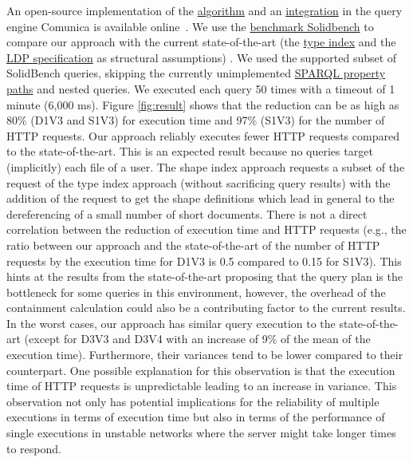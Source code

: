 An open-source implementation of the \href{https://github.com/constraintAutomaton/query-shape-detection}{algorithm} and an 
\href{https://github.com/constraintAutomaton/comunica-feature-link-traversal/tree/feature/shapeIndex}{integration} in the query engine 
Comunica \cite{taelman_iswc_resources_comunica_2018} is available online~.
We use the \href{https://github.com/SolidBench/SolidBench.js}{benchmark Solidbench} \cite{Taelman2023} to compare our approach with the current state-of-the-art (the \href{https://solid.github.io/type-indexes/}{type index} and the \href{https://www.w3.org/TR/ldp/}{LDP specification} as structural assumptions) \cite{Taelman2023}.
We used the supported subset of SolidBench queries, skipping the currently unimplemented \href{https://www.w3.org/TR/sparql11-query/#propertypaths}{SPARQL property paths} and nested queries.
We executed each query 50 times with a timeout of 1 minute (6,000 ms).
Figure \ref{fig:result} shows that the reduction can be as high as 80\% (D1V3 and S1V3) for execution time 
and 97\% (S1V3) for the number of HTTP requests.
Our approach reliably executes fewer HTTP requests compared to the state-of-the-art.
This is an expected result because no queries target (implicitly) each file of a user.
The shape index approach requests a subset of the request of the type index approach (without sacrificing query results) with the addition of the request to get the shape definitions which lead in general to the dereferencing of a small number of short documents.
There is not a direct correlation between the reduction of execution time and HTTP requests (e.g., the ratio 
between our approach and the state-of-the-art of the number of HTTP requests by the execution time for D1V3 is 0.5 compared to 0.15 for S1V3).
This hints at the results from the state-of-the-art \cite{Taelman2023} proposing that the query plan is the bottleneck for some queries in this environment,
however, the overhead of the containment calculation could also be a contributing factor to the current results.
In the worst cases, our approach  has similar query execution to the state-of-the-art (except for D3V3 and D3V4 with an increase of 9\% of the mean of the execution time).
Furthermore, their variances tend to be lower compared to their counterpart. 
One possible explanation for this observation is that the execution time of HTTP requests is unpredictable \cite{hartig2016walking}
leading to an increase in variance.
This observation not only has potential implications for the reliability of multiple executions in terms of execution time
but also in terms of the performance of single executions in unstable networks where the server might take longer times to respond. 


